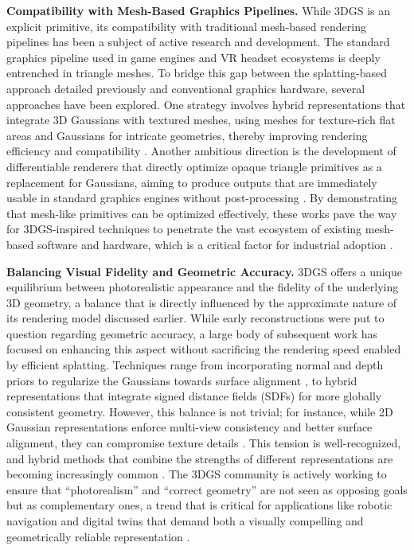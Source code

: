 \documentclass[11pt]{article}
\begin{document}
\textbf{Compatibility with Mesh-Based Graphics Pipelines.} While 3DGS is an explicit primitive, its compatibility with traditional mesh-based rendering pipelines has been a subject of active research and development. The standard graphics pipeline used in game engines and VR headset ecosystems is deeply entrenched in triangle meshes. To bridge this gap between the splatting-based approach detailed previously and conventional graphics hardware, several approaches have been explored. One strategy involves hybrid representations that integrate 3D Gaussians with textured meshes, using meshes for texture-rich flat areas and Gaussians for intricate geometries, thereby improving rendering efficiency and compatibility \cite{ref47}. Another ambitious direction is the development of differentiable renderers that directly optimize opaque triangle primitives as a replacement for Gaussians, aiming to produce outputs that are immediately usable in standard graphics engines without post-processing \cite{ref48}. By demonstrating that mesh-like primitives can be optimized effectively, these works pave the way for 3DGS-inspired techniques to penetrate the vast ecosystem of existing mesh-based software and hardware, which is a critical factor for industrial adoption \cite{ref37}.

\textbf{Balancing Visual Fidelity and Geometric Accuracy.} 3DGS offers a unique equilibrium between photorealistic appearance and the fidelity of the underlying 3D geometry, a balance that is directly influenced by the approximate nature of its rendering model discussed earlier. While early reconstructions were put to question regarding geometric accuracy, a large body of subsequent work has focused on enhancing this aspect without sacrificing the rendering speed enabled by efficient splatting. Techniques range from incorporating normal and depth priors to regularize the Gaussians towards surface alignment \cite{ref49}, to hybrid representations that integrate signed distance fields (SDFs) for more globally consistent geometry. However, this balance is not trivial; for instance, while 2D Gaussian representations enforce multi-view consistency and better surface alignment, they can compromise texture details \cite{ref50}. This tension is well-recognized, and hybrid methods that combine the strengths of different representations are becoming increasingly common \cite{ref51}. The 3DGS community is actively working to ensure that ``photorealism'' and ``correct geometry'' are not seen as opposing goals but as complementary ones, a trend that is critical for applications like robotic navigation and digital twins that demand both a visually compelling and geometrically reliable representation \cite{ref4}.
\end{document}
